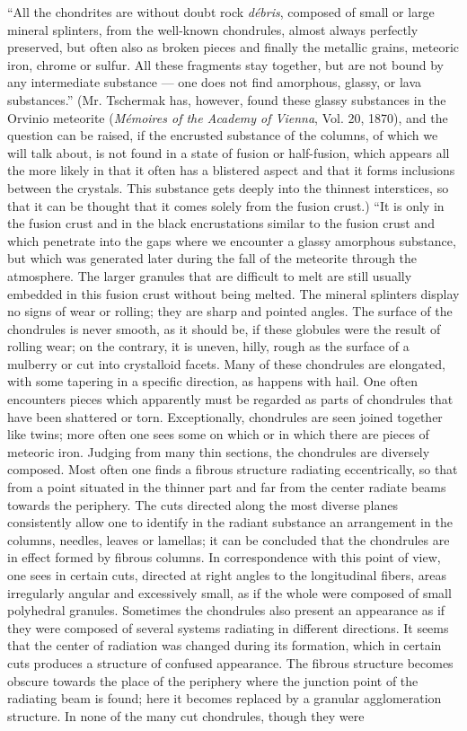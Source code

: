 \documentclass[a4paper, 12pt, oneside]{article}
\begin{document}
``All the chondrites are without doubt rock \emph{débris}, composed of small or large mineral splinters, from the well-known chondrules, almost always perfectly preserved, but often also as broken pieces and finally the metallic grains, meteoric iron, chrome or sulfur. All these fragments stay together, but are not bound by any intermediate substance --- one does not find amorphous, glassy, or lava substances.'' (Mr. Tschermak has, however, found these glassy substances in the Orvinio meteorite (\emph{Mémoires of the Academy of Vienna}, Vol. 20, 1870), and the question can be raised, if the encrusted substance of the columns, of which we will talk about, is not found in a state of fusion or half-fusion, which appears all the more likely in that it often has a blistered aspect and that it forms inclusions between the crystals. This substance gets deeply into the thinnest interstices, so that it can be thought that it comes solely from the fusion crust.) ``It is only in the fusion crust and in the black encrustations similar to the fusion crust and which penetrate into the gaps where we encounter a glassy amorphous substance, but which was generated later during the fall of the meteorite through the atmosphere. The larger granules that are difficult to melt are still usually embedded in this fusion crust without being melted. The mineral splinters display no signs of wear or rolling; they are sharp and pointed angles. The surface of the chondrules is never smooth, as it should be, if these globules were the result of rolling wear; on the contrary, it is uneven, hilly, rough as the surface of a mulberry or cut into crystalloid facets. Many of these chondrules are elongated, with some tapering in a specific direction, as happens with hail. One often encounters pieces which apparently must be regarded as parts of chondrules that have been shattered or torn. Exceptionally, chondrules are seen joined together like twins; more often one sees some on which or in which there are pieces of meteoric iron. Judging from many thin sections, the chondrules are diversely composed. Most often one finds a fibrous structure radiating eccentrically, so that from a point situated in the thinner part and far from the center radiate beams towards the periphery. The cuts directed along the most diverse planes consistently allow one to identify in the radiant substance an arrangement in the columns, needles, leaves or lamellas; it can be concluded that the chondrules are in effect formed by fibrous columns. In correspondence with this point of view, one sees in certain cuts, directed at right angles to the longitudinal fibers, areas irregularly angular and excessively small, as if the whole were composed of small polyhedral granules. Sometimes the chondrules also present an appearance as if they were composed of several systems radiating in different directions. It seems that the center of radiation was changed during its formation, which in certain cuts produces a structure of confused appearance. The fibrous structure becomes obscure towards the place of the periphery where the junction point of the radiating beam is found; here it becomes replaced by a granular agglomeration structure. In none of the many cut chondrules, though they were 
\end{document}
